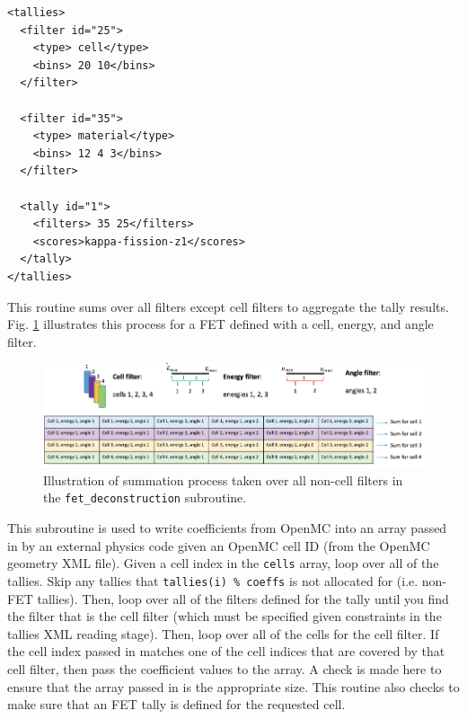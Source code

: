 \documentclass[10pt]{article}
\newcounter{subsubsubsection}[subsubsection]
\numberwithin{equation}{section} %
\begin{document}
\begin{lstlisting}
<tallies>
  <filter id="25">
    <type> cell</type>
    <bins> 20 10</bins>
  </filter>

  <filter id="35">
    <type> material</type>
    <bins> 12 4 3</bins>
  </filter>

  <tally id="1">
    <filters> 35 25</filters>
    <scores>kappa-fission-z1</scores>
  </tally>
</tallies>
\end{lstlisting}

This routine sums over all filters except cell filters to aggregate the tally results. Fig. \ref{fig:fet-deconstruction} illustrates this process for a FET defined with a cell, energy, and angle filter.

\begin{figure}[H]
\centering
\includegraphics[width=17.5cm]{figures/fet-deconstruction.png}
\caption{Illustration of summation process taken over all non-cell filters in the {\tt fet\_deconstruction} subroutine.}
\label{fig:fet-deconstruction}
\end{figure}

This subroutine is used to write coefficients from OpenMC into an array passed in by an external physics code given an OpenMC cell ID (from the OpenMC geometry XML file). Given a cell index in the {\tt cells} array, loop over all of the tallies. Skip any tallies that {\tt tallies(i) \% coeffs} is not allocated for (i.e. non-FET tallies). Then, loop over all of the filters defined for the tally until you find the filter that is the cell filter (which must be specified given constraints in the tallies XML reading stage). Then, loop over all of the cells for the cell filter. If the cell index passed in matches one of the cell indices that are covered by that cell filter, then pass the coefficient values to the array. A check is made here to ensure that the array passed in is the appropriate size. This routine also checks to make sure that an FET tally is defined for the requested cell.
\end{document}
